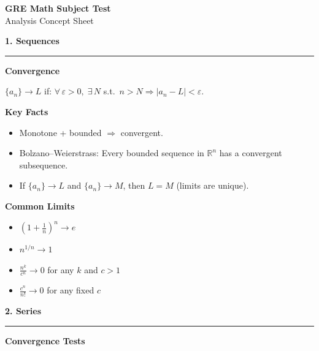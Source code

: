 \documentclass[10pt,twocolumn]{article}
\newcommand{\sect}[1]{\medskip\noindent\textbf{\large #1}\medskip\hrule\smallskip}
\newcommand{\subsect}[1]{\smallskip\noindent\textbf{#1}\par}
\begin{document}
\begin{center}
{\LARGE\bfseries GRE Math Subject Test}\\[2pt]
{\Large Analysis Concept Sheet}
\end{center}

\vspace{-4pt}

\sect{1. Sequences}

\subsect{Convergence}
$\{a_n\}\to L$ if: $\forall\,\varepsilon>0,\;\exists\,N$ s.t.\ $n>N \Rightarrow |a_n-L|<\varepsilon$.

\subsect{Key Facts}
\begin{itemize}[nosep,leftmargin=*]
\item Monotone + bounded $\Rightarrow$ convergent.
\item Bolzano--Weierstrass: Every bounded sequence in $\mathbb{R}^n$ has a convergent subsequence.
\item If $\{a_n\}\to L$ and $\{a_n\}\to M$, then $L=M$ (limits are unique).
\end{itemize}

\subsect{Common Limits}
\begin{itemize}[nosep,leftmargin=*]
\item $\left(1+\frac{1}{n}\right)^n \to e$
\item $n^{1/n}\to 1$
\item $\frac{n^k}{c^n}\to 0$ for any $k$ and $c>1$
\item $\frac{c^n}{n!}\to 0$ for any fixed $c$
\end{itemize}

\sect{2. Series}

\subsect{Convergence Tests}
\end{document}
